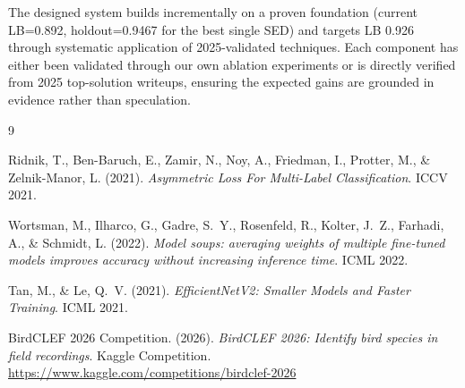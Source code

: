 \documentclass[11pt,a4paper]{article}
\begin{document}
The designed system builds incrementally on a proven foundation (current LB=0.892,
holdout=0.9467 for the best single SED) and targets LB 0.926 through systematic
application of 2025-validated techniques. Each component has either been validated
through our own ablation experiments or is directly verified from 2025 top-solution
writeups, ensuring the expected gains are grounded in evidence rather than speculation.

\begin{thebibliography}{9}

Ridnik, T., Ben-Baruch, E., Zamir, N., Noy, A., Friedman, I., Protter, M., \& Zelnik-Manor, L.
(2021).
\textit{Asymmetric Loss For Multi-Label Classification}.
ICCV 2021.

Wortsman, M., Ilharco, G., Gadre, S.~Y., Rosenfeld, R., Kolter, J.~Z., Farhadi, A., \& Schmidt, L.
(2022).
\textit{Model soups: averaging weights of multiple fine-tuned models improves accuracy without
increasing inference time}.
ICML 2022.

Tan, M., \& Le, Q.~V.
(2021).
\textit{EfficientNetV2: Smaller Models and Faster Training}.
ICML 2021.

BirdCLEF 2026 Competition.
(2026).
\textit{BirdCLEF 2026: Identify bird species in field recordings}.
Kaggle Competition. \url{https://www.kaggle.com/competitions/birdclef-2026}

\end{thebibliography}
\end{document}
